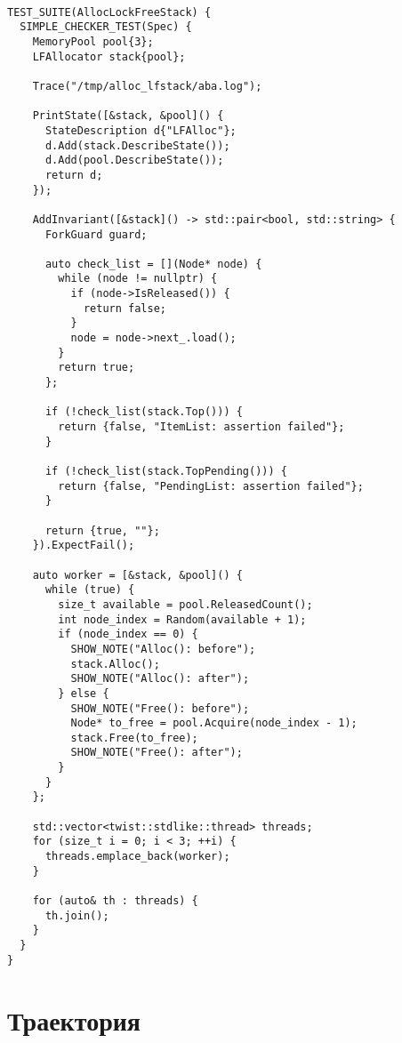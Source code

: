 \begin{codebr}
	
	\begin{verbatim}

TEST_SUITE(AllocLockFreeStack) {
  SIMPLE_CHECKER_TEST(Spec) {
    MemoryPool pool{3};
    LFAllocator stack{pool};

    Trace("/tmp/alloc_lfstack/aba.log");

    PrintState([&stack, &pool]() {
      StateDescription d{"LFAlloc"};
      d.Add(stack.DescribeState());
      d.Add(pool.DescribeState());
      return d;
    });

    AddInvariant([&stack]() -> std::pair<bool, std::string> {
      ForkGuard guard;

      auto check_list = [](Node* node) {
        while (node != nullptr) {
          if (node->IsReleased()) {
            return false;
          }
          node = node->next_.load();
        }
        return true;
      };

      if (!check_list(stack.Top())) {
        return {false, "ItemList: assertion failed"};
      }

      if (!check_list(stack.TopPending())) {
        return {false, "PendingList: assertion failed"};
      }

      return {true, ""};
    }).ExpectFail();

    auto worker = [&stack, &pool]() {
      while (true) {
        size_t available = pool.ReleasedCount();
        int node_index = Random(available + 1);
        if (node_index == 0) {
          SHOW_NOTE("Alloc(): before");
          stack.Alloc();
          SHOW_NOTE("Alloc(): after");
        } else {
          SHOW_NOTE("Free(): before");
          Node* to_free = pool.Acquire(node_index - 1);
          stack.Free(to_free);
          SHOW_NOTE("Free(): after");
        }
      }
    };

    std::vector<twist::stdlike::thread> threads;
    for (size_t i = 0; i < 3; ++i) {
      threads.emplace_back(worker);
    }

    for (auto& th : threads) {
      th.join();
    }
  }
}

	\end{verbatim}
	
\end{codebr}

\pagebreak

\section{Траектория}\label{app:trace}

